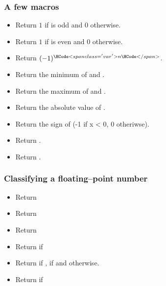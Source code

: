 \subsubsection{A few macros}
\begin{itemize}
\item {}
  \sshortdescribe Return $1$ if  is odd and $0$ otherwise.
\item {}
  \sshortdescribe Return $1$ if  is even and $0$ otherwise.
\item {}
  \sshortdescribe Return $(-1)^{\var{n}}$.
\item {}
  \sshortdescribe Return the minimum of  and .
\item {}
  \sshortdescribe Return the maximum of  and .
\item {}
  \sshortdescribe Return the absolute value of .
\item {}
  \sshortdescribe Return the sign of  (-1 if x < 0, 0 otheriwse).
\item {}
  \sshortdescribe Return .
\item {}
  \sshortdescribe Return .
\end{itemize}

\subsubsection{Classifying a floating--point number}

\begin{itemize}
  \item {}
    \sshortdescribe Return 
  \item {}
    \sshortdescribe Return 
  \item {}
    \sshortdescribe Return 
  \item {}
    \sshortdescribe Return  if 
  \item {}
    \sshortdescribe Return  if ,  if 
    and  otherwise.
  \item {}
    \sshortdescribe Return  if 
\end{itemize}

